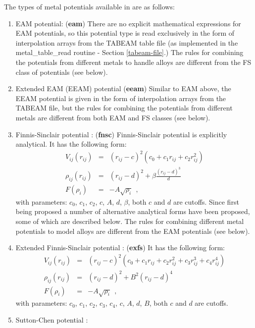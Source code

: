 The types of metal potentials available in \D are as follows:
\begin{enumerate}
\item EAM potential:  ({\bf eam})
There are no explicit mathematical expressions for EAM potentials, so
this potential type is read exclusively in the form of interpolation
arrays from the TABEAM table file (as implemented in the {\sc
metal\_table\_read} routine - Section \ref{tabeam-file}.)  The rules
for combining the potentials from different metals to handle alloys
are different from the FS class of potentials (see below).
\item Extended EAM (EEAM) potential ({\bf eeam})
Similar to EAM above, the EEAM potential is given in the form of
interpolation arrays from the TABEAM file, but the rules for combining
the potentials from different metals are different from both EAM and FS
classes (see below).
\item Finnis-Sinclair potential \cite{finnis-84a}:  ({\bf fnsc})
Finnis-Sinclair potential is explicitly analytical.  It has the following form:
\begin{eqnarray}
V_{ij}(r_{ij}) &=& (r_{ij}-c)^{2} (c_{0}+c_{1}r_{ij}+c_{2}r_{ij}^{2}) \nonumber \\
\rho_{ij}(r_{ij}) &=& (r_{ij}-d)^{2} + \beta \frac{(r_{ij}-d)^{3}}{d} \\
F(\rho_{i}) &=& -A \sqrt{\rho_{i}}~~, \nonumber
\end{eqnarray}
with parameters: $c_{0}$, $c_{1}$, $c_{2}$, $c$, $A$, $d$, $\beta$,
both $c$ and $d$ are cutoffs.  Since first being proposed a number of
alternative analytical forms have been proposed, some of which are
described below.  The rules for combining different metal potentials to
model alloys are different from the EAM potentials (see below).
\item Extended Finnis-Sinclair potential \cite{dai-06}:  ({\bf exfs})
It has the following form:
\begin{eqnarray}
V_{ij}(r_{ij}) &=& (r_{ij}-c)^{2}
(c_{0}+c_{1}r_{ij}+c_{2}r_{ij}^{2}+c_{3}r_{ij}^{3}+c_{4}r_{ij}^{4}) \nonumber \\
\rho_{ij}(r_{ij}) &=& (r_{ij}-d)^{2} + B^{2} (r_{ij}-d)^{4} \\
F(\rho_{i}) &=& -A \sqrt{\rho_{i}}~~, \nonumber
\end{eqnarray}
with parameters: $c_{0}$, $c_{1}$, $c_{2}$, $c_{3}$, $c_{4}$, $c$, $A$, $d$, $B$,
both $c$ and $d$ are cutoffs.
\item Sutton-Chen potential \cite{sutton-90a,sutton-91a,todd-93a}:

\end{enumerate}
